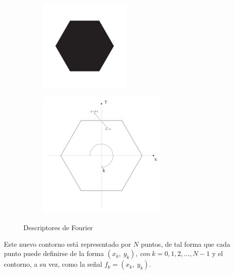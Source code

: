 \begin{figure}[H]
	\centering
	\captionsetup{justification=centering}
	\begin{subfigure}{0.5\textwidth}
		\centering
		\captionsetup{justification=centering}
		\includegraphics[width=0.5\textwidth]{imagenes/marco_teorico/Descriptores_Fourier/Poligono_trazo_continuo.pdf}	
		\caption{}
		\label{fig:fourier_poligono_trazo_continuo}
	\end{subfigure}
	\hfill
	\begin{subfigure}{0.7\textwidth}
		\centering
		\captionsetup{justification=centering}
		\includegraphics[width=0.7\textwidth]{imagenes/marco_teorico/Descriptores_Fourier/Poligono_ejesXY_k_figura.pdf}	
		\caption{}
		\label{fig:fourier_poligono_trazo_discontinuo}
	\end{subfigure}	
	\caption{Descriptores de Fourier}
	\label{fig:fourier_esquema}
\end{figure}

Este nuevo contorno está representado por $N$ puntos, de tal forma que cada punto puede definirse de la forma $ (x_{k},\:y_{k}),\:con\:k = 0, 1, 2, ..., N-1 $ y el contorno, a su vez, como la señal $f_{k} = (x_{k},\:y_{k})$.

